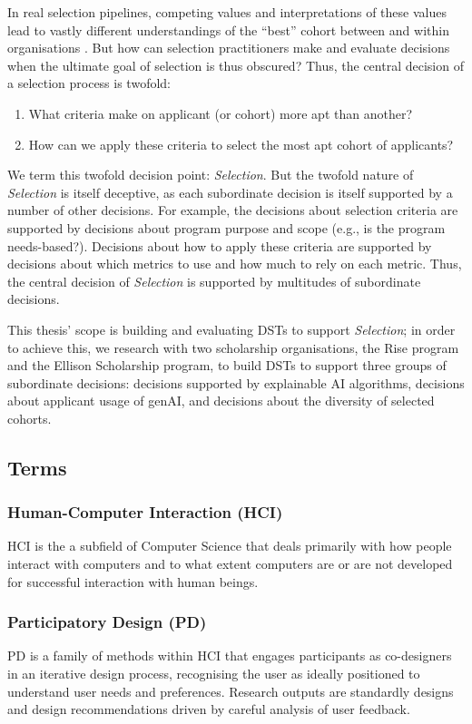 In real selection pipelines, competing values and interpretations of these values lead to vastly different understandings of the ``best'' cohort between and within organisations \cite{zimmerman_research_2014}. But how can selection practitioners make and evaluate decisions when the ultimate goal of selection is thus obscured? Thus, the central decision of a selection process is twofold: 

\begin{enumerate}
    \item What criteria make on applicant (or cohort) more apt than another?
    \item How can we apply these criteria to select the most apt cohort of applicants?
\end{enumerate}

We term this twofold decision point: \emph{Selection}. But the twofold nature of \emph{Selection} is itself deceptive, as each subordinate decision is itself supported by a number of other decisions. For example, the decisions about selection criteria are supported by decisions about program purpose and scope (e.g., is the program needs-based?). Decisions about how to apply these criteria are supported by decisions about which metrics to use and how much to rely on each metric. Thus, the central decision of \emph{Selection} is supported by multitudes of subordinate decisions. 

This thesis' scope is building and evaluating DSTs to support \emph{Selection}; in order to achieve this, we research with two scholarship organisations, the Rise program and the Ellison Scholarship program, to build DSTs to support three groups of subordinate decisions: decisions supported by explainable AI algorithms, decisions about applicant usage of genAI, and decisions about the diversity of selected cohorts.

\subsection{Terms}

\subsubsection{Human-Computer Interaction (HCI)}
HCI is the a subfield of Computer Science that deals primarily with how people interact with computers and to what extent computers are or are not developed for successful interaction with human beings.

\subsubsection{Participatory Design (PD)}
PD is a family of methods within HCI that engages participants as co-designers in an iterative design process, recognising the user as ideally positioned to understand user needs and preferences. Research outputs are standardly designs and design recommendations driven by careful analysis of user feedback.

